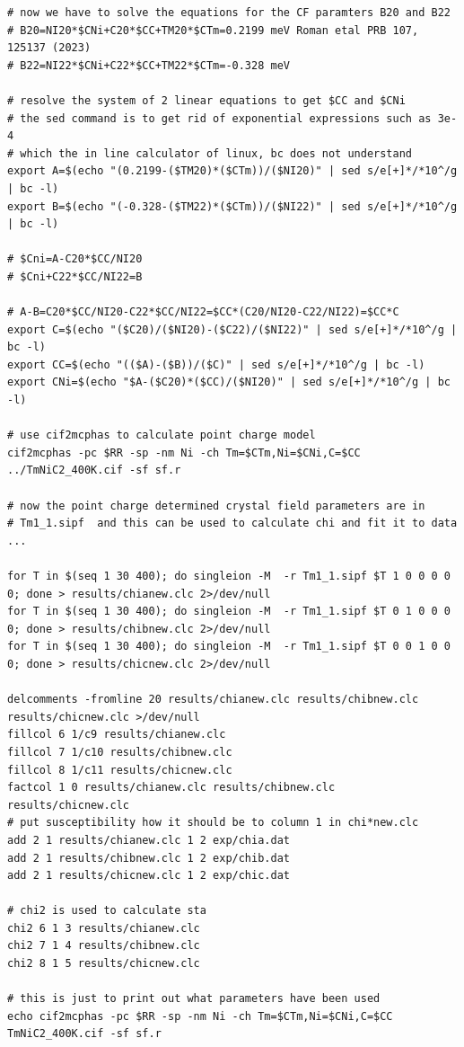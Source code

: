 \begin{verbatim}
# now we have to solve the equations for the CF paramters B20 and B22
# B20=NI20*$CNi+C20*$CC+TM20*$CTm=0.2199 meV Roman etal PRB 107, 125137 (2023) 
# B22=NI22*$CNi+C22*$CC+TM22*$CTm=-0.328 meV

# resolve the system of 2 linear equations to get $CC and $CNi 
# the sed command is to get rid of exponential expressions such as 3e-4
# which the in line calculator of linux, bc does not understand 
export A=$(echo "(0.2199-($TM20)*($CTm))/($NI20)" | sed s/e[+]*/*10^/g | bc -l)
export B=$(echo "(-0.328-($TM22)*($CTm))/($NI22)" | sed s/e[+]*/*10^/g | bc -l)

# $Cni=A-C20*$CC/NI20
# $Cni+C22*$CC/NI22=B

# A-B=C20*$CC/NI20-C22*$CC/NI22=$CC*(C20/NI20-C22/NI22)=$CC*C
export C=$(echo "($C20)/($NI20)-($C22)/($NI22)" | sed s/e[+]*/*10^/g | bc -l)
export CC=$(echo "(($A)-($B))/($C)" | sed s/e[+]*/*10^/g | bc -l)
export CNi=$(echo "$A-($C20)*($CC)/($NI20)" | sed s/e[+]*/*10^/g | bc -l)

# use cif2mcphas to calculate point charge model
cif2mcphas -pc $RR -sp -nm Ni -ch Tm=$CTm,Ni=$CNi,C=$CC ../TmNiC2_400K.cif -sf sf.r

# now the point charge determined crystal field parameters are in
# Tm1_1.sipf  and this can be used to calculate chi and fit it to data ...

for T in $(seq 1 30 400); do singleion -M  -r Tm1_1.sipf $T 1 0 0 0 0 0; done > results/chianew.clc 2>/dev/null
for T in $(seq 1 30 400); do singleion -M  -r Tm1_1.sipf $T 0 1 0 0 0 0; done > results/chibnew.clc 2>/dev/null
for T in $(seq 1 30 400); do singleion -M  -r Tm1_1.sipf $T 0 0 1 0 0 0; done > results/chicnew.clc 2>/dev/null

delcomments -fromline 20 results/chianew.clc results/chibnew.clc results/chicnew.clc >/dev/null
fillcol 6 1/c9 results/chianew.clc
fillcol 7 1/c10 results/chibnew.clc
fillcol 8 1/c11 results/chicnew.clc
factcol 1 0 results/chianew.clc results/chibnew.clc results/chicnew.clc
# put susceptibility how it should be to column 1 in chi*new.clc
add 2 1 results/chianew.clc 1 2 exp/chia.dat
add 2 1 results/chibnew.clc 1 2 exp/chib.dat
add 2 1 results/chicnew.clc 1 2 exp/chic.dat

# chi2 is used to calculate sta 
chi2 6 1 3 results/chianew.clc
chi2 7 1 4 results/chibnew.clc
chi2 8 1 5 results/chicnew.clc

# this is just to print out what parameters have been used
echo cif2mcphas -pc $RR -sp -nm Ni -ch Tm=$CTm,Ni=$CNi,C=$CC TmNiC2_400K.cif -sf sf.r

\end{verbatim}

